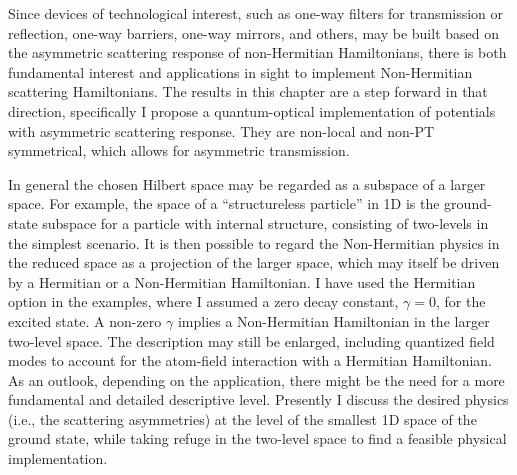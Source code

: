Since devices of technological interest, such as one-way filters for transmission or reflection, one-way barriers, one-way mirrors, and others, may be built based on the asymmetric scattering response of non-Hermitian Hamiltonians, there is both fundamental
interest and applications in sight to implement Non-Hermitian scattering Hamiltonians. The results in this chapter are a step forward in that direction, specifically I propose a quantum-optical implementation of potentials with asymmetric scattering response.
They are non-local and non-PT symmetrical, which allows for asymmetric transmission.

In general the chosen Hilbert space may  be regarded as a subspace of a larger space. For example,  the space of a ``structureless particle'' in 1D is the ground-state subspace
for a particle with internal structure, consisting of two-levels in the simplest scenario.
It is then possible to regard the Non-Hermitian physics in the reduced space
as a projection of the larger space, which may itself be driven by a  Hermitian or a Non-Hermitian Hamiltonian.
I have used the Hermitian option in the examples, where I assumed a zero decay constant, $\gamma=0$, for the excited state.
A non-zero $\gamma$ implies  a Non-Hermitian  Hamiltonian in the larger two-level space. The description may still be
enlarged,  including  quantized field modes to account for the atom-field interaction with a Hermitian Hamiltonian.
As an outlook, depending on the application, there might be the need for a more fundamental and detailed descriptive level. Presently I discuss the desired physics (i.e., the scattering asymmetries) at the level of the smallest 1D space of the ground state, while taking refuge in the
two-level space to find a feasible physical implementation.
